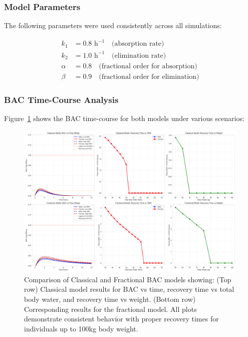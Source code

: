 \documentclass[11pt]{article}
\begin{document}
\subsubsection{Model Parameters}

The following parameters were used consistently across all simulations:

\begin{align}
k_1 &= 0.8 \text{ h}^{-1} \quad \text{(absorption rate)} \\
k_2 &= 1.0 \text{ h}^{-1} \quad \text{(elimination rate)} \\
\alpha &= 0.8 \quad \text{(fractional order for absorption)} \\
\beta &= 0.9 \quad \text{(fractional order for elimination)}
\end{align}

\subsubsection{BAC Time-Course Analysis}

Figure~\ref{fig:bac_comparison} shows the BAC time-course for both models under various scenarios:

\begin{figure}[H]
    \centering
    \includegraphics[width=\textwidth]{bac_comparison.png}
    \caption{Comparison of Classical and Fractional BAC models showing: (Top row) Classical model results for BAC vs time, recovery time vs total body water, and recovery time vs weight. (Bottom row) Corresponding results for the fractional model. All plots demonstrate consistent behavior with proper recovery times for individuals up to 100kg body weight.}
    \label{fig:bac_comparison}
\end{figure}
\end{document}
